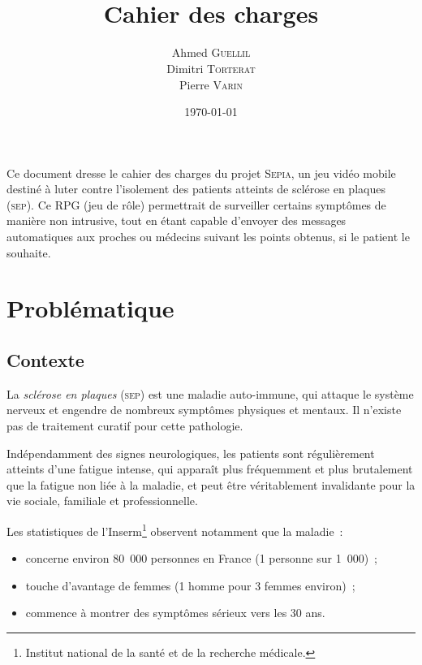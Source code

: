 \documentclass[a4paper,12pt,francais]{article}
\title{\Sepia\\Cahier des charges}
\author{Ahmed \textsc{Guellil}\\
    Dimitri \textsc{Torterat}\\
    Pierre \textsc{Varin}
}
\date{\today} %
\newcommand{\SEP}{\textsc{sep}\xspace}
\newcommand{\Sepia}{\textsc{Sepia}\xspace}
\begin{document}
\renewcommand{\contentsname}{Sommaire}

\maketitle

Ce document dresse le cahier des charges du projet \Sepia, un jeu vidéo mobile destiné à luter contre l’isolement des patients atteints de sclérose en plaques (\SEP). Ce RPG (jeu de rôle) permettrait de surveiller certains symptômes de manière non intrusive, tout en étant capable d’envoyer des messages automatiques aux proches ou médecins suivant les points obtenus, si le patient le souhaite.


\newpage
\tableofcontents
\newpage

\section{Problématique}
\subsection{Contexte}

La \emph{sclérose en plaques} (\SEP{}) est une maladie auto-immune, qui attaque le système nerveux et engendre de nombreux symptômes physiques et mentaux. Il n’existe pas de traitement curatif pour cette pathologie.

Indépendamment des signes neurologiques, les patients sont régulièrement atteints d’une fatigue intense, qui apparaît plus fréquemment et plus brutalement que la fatigue non liée à la maladie, et peut être véritablement invalidante pour la vie sociale, familiale et professionnelle.

Les statistiques de l’Inserm\footnote{Institut national de la santé et de la recherche médicale.} observent notamment que la maladie~:
\begin{itemize}
\item concerne environ 80~000 personnes en France (1 personne sur 1~000)~;
\item touche d’avantage de femmes (1 homme pour 3 femmes environ)~;
\item commence à montrer des symptômes sérieux vers les 30 ans.
\end{itemize}
\end{document}
